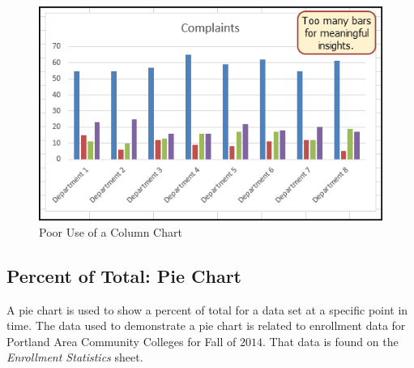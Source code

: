 \begin{figure}[H]
	\centering
	\includegraphics[width=\maxwidth{.95\linewidth}]{gfx/ch04_fig20}
	\caption{Poor Use of a Column Chart}
	\label{04:fig20}
\end{figure}

\subsection{Percent of Total: Pie Chart}

A pie chart is used to show a percent of total for a data set at a specific point in time. The data used to demonstrate a pie chart is related to enrollment data for Portland Area Community Colleges for Fall of $ 2014 $. That data is found on the \textit{Enrollment Statistics} sheet.

